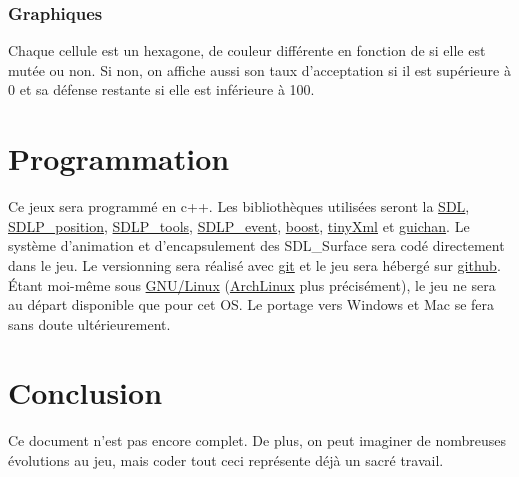 \documentclass{article}
\begin{document}
\subsubsection{Graphiques}
Chaque cellule est un hexagone, de couleur différente en fonction de si elle est mutée ou non. Si non, on affiche aussi son taux d'acceptation si il est supérieure à 0 et sa défense restante si elle est inférieure à 100.

\section{Programmation}
Ce jeux sera programmé en c++. Les bibliothèques utilisées seront la \href{http://www.libsdl.org/}{SDL}, \href{https://github.com/lucas8/SDLP\_position}{SDLP\_position}, \href{https://github.com/lucas8/SDLP\_tools}{SDLP\_tools}, \href{https://github.com/lucas8/SDLP\_event}{SDLP\_event}, \href{http://www.boost.org/}{boost}, \href{http://www.grinninglizard.com/tinyxml/index.html}{tinyXml} et \href{http://guichan.sourceforge.net/wiki/index.php/Main\_Page}{guichan}. Le système d'animation et d'encapsulement des SDL\_Surface sera codé directement dans le jeu. Le versionning sera réalisé avec \href{http://git-scm.com/}{git} et le jeu sera hébergé sur \href{https://github.com/}{github}. Étant moi-même sous \href{https://fr.wikipedia.org/wiki/Linux}{GNU/Linux} (\href{http://www.archlinux.org/}{ArchLinux} plus précisément), le jeu ne sera au départ disponible que pour cet OS. Le portage vers Windows et Mac se fera sans doute ultérieurement.

\section{Conclusion}
Ce document n'est pas encore complet. De plus, on peut imaginer de nombreuses évolutions au jeu, mais coder tout ceci représente déjà un sacré travail.
\end{document}
